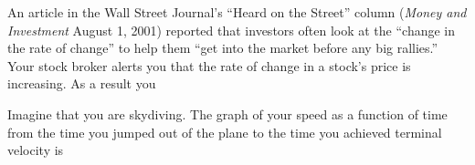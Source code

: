 \documentclass{ximera}
\newcommand{\recommendation}[1]{}
\newcommand{\GoodQuestions}[1]{}
\begin{document}



\begin{problem}
  \recommendation{Vic}
  \GoodQuestions{Subject: Mean Value Theorem and shapes of curves 1P}

  An article in the Wall Street Journal's ``Heard on the Street''
  column (\emph{Money and Investment} August 1, 2001) reported that
  investors often look at the ``change in the rate of change'' to help
  them ``get into the market before any big rallies.''  Your stock
  broker alerts you that the rate of change in a stock's price is
  increasing.  As a result you
  \begin{multipleChoice}
  \end{multipleChoice}
\end{problem}

\begin{problem}
  \recommendation{Vic}
  \GoodQuestions{Subject: Mean Value Theorem and shapes of curves 2P}
  
  Imagine that you are skydiving.  The graph of your speed as a
  function of time from the time you jumped out of the plane to the
  time you achieved terminal velocity is
  \begin{multipleChoice}
  \end{multipleChoice}
\end{problem}
\end{document}
